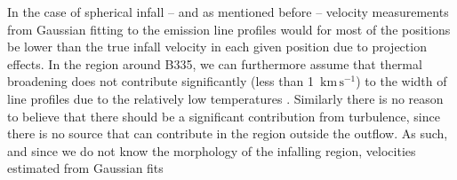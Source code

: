 \documentclass{aa}
\newcommand{\kmpers}{\ensuremath{\mathrm{km \, s^{-1}}}\xspace} %
\begin{document}
In the case of spherical infall -- and as mentioned before -- velocity measurements from Gaussian fitting to the emission line profiles would for most of the positions be lower than the true infall velocity in each given position due to projection effects. %
In the region around B335, we can furthermore assume that thermal broadening does not contribute significantly (less than 1~\kmpers) to the width of line profiles due to the relatively low temperatures \citep[200~K, see:][]{Bjerkeli:2019ip}. Similarly there is no reason to believe that there should be a significant contribution from turbulence, since there is no source that can contribute in the region outside the outflow. 
As such, and since we do not know the morphology of the infalling region, velocities estimated from Gaussian fits
\end{document}
